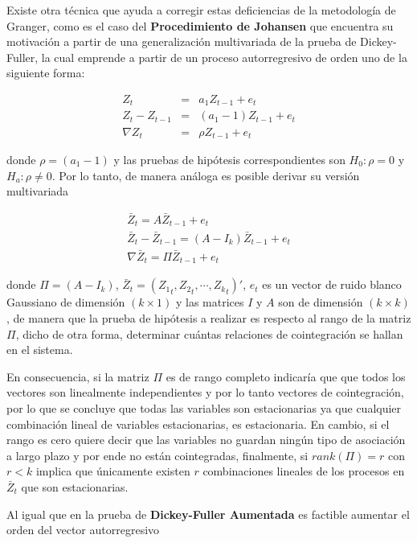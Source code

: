 Existe otra técnica que ayuda a corregir estas deficiencias de la metodología de Granger, como es el caso del \textbf{Procedimiento de Johansen} que encuentra su motivación a partir de una generalización multivariada de la prueba de Dickey-Fuller, la cual emprende a partir de un proceso autorregresivo de orden uno de la siguiente forma:

\begin{eqnarray}
Z_{t} &=& a_1Z_{t-1} + e_t \nonumber \\
Z_{t}- Z_{t-1} &=& (a_1 - 1) Z_{t-1} +e_t \nonumber \\
\nabla Z_t &=& \rho Z_{t-1} + e_t \nonumber
\end{eqnarray}

donde $\rho=(a_1 - 1)$ y las pruebas de hipótesis correspondientes son $H_0: \rho=0$ y $H_a: \rho \neq 0$. Por lo tanto, de manera análoga es posible derivar su versión multivariada 

\begin{eqnarray}
\bar{Z}_t = A \bar{Z}_{t-1} + e_t \nonumber \\
\bar{Z}_t - \bar{Z}_{t-1}= (A- I_k) \bar{Z}_{t-1} + e_t \\
\nabla \bar{Z}_t = \Pi\bar{Z}_{t-1} + e_t \nonumber 
\end{eqnarray}

donde $\Pi= (A-I_k)$, $\bar{Z}_t= \left ( {Z_1}_t, {Z_2}_t, \cdots, {Z_k}_t \right )'$,  $e_t$ es un  vector de ruido blanco Gaussiano de dimensión $(k \times 1)$ y las matrices $I$ y $A$ son de dimensión $(k \times k)$, de manera que la prueba de hipótesis a realizar es respecto al rango de la matriz $\Pi$, dicho de otra forma, determinar cuántas relaciones de cointegración se hallan en el sistema.\bigskip 

 En consecuencia, si la matriz $\Pi$ es de rango completo indicaría que que todos los vectores son linealmente independientes y por lo tanto vectores de cointegración, por lo que se concluye que todas las variables son estacionarias  ya que cualquier combinación lineal de variables estacionarias, es estacionaria. En cambio, si el rango es cero quiere decir que las variables no guardan ningún tipo de asociación a largo plazo y por ende no están cointegradas, finalmente, si $rank(\Pi)=r$ con $r<k$ implica que únicamente existen $r$ combinaciones lineales de los procesos en $\bar{Z}_t$  que son estacionarias.\bigskip 
 
 Al igual que en la prueba de \textbf{Dickey-Fuller Aumentada} es factible aumentar el orden del vector autorregresivo
 
